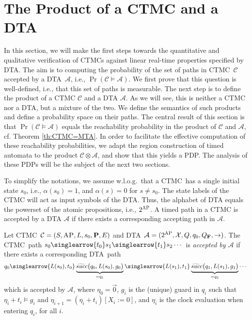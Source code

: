 \documentclass{LMCS}
\newcommand{\mc}[1]{\mathcal{#1}}
\newcommand{\<}{\langle}
\renewcommand{\>}{\rangle}
\newcommand{\mC}{\mathcal{C}}
\newcommand{\mA}{\mathcal{A}}
\newcommand{\CTMC}{\textsc{{CTMC}}}
\newcommand{\DTA}{\textsc{DTA}}
\newcommand{\mv}[1]{\singlearrow{#1}}
\renewcommand{\P}{{\bf P}}
\newcommand{\AP}{\textsc{AP}}
\begin{document}
\section{The Product of a CTMC and a DTA}\label{sec:DTA}

In this section, we will make the first steps towards the quantitative and qualitative
verification of CTMCs against linear real-time properties specified by \DTA.
The aim is to computing the probability of the set of paths in \CTMC\ $\mC$
accepted by a \DTA\ $\mA$, i.e., $\Pr(\mc{C} \models \mc{A})$.
We first prove that this question is well-defined, i.e., that this set of paths is
measurable.
The next step is to define the product of a CTMC $\mc{C}$ and a DTA $\mc{A}$.
As we will see, this is neither a CTMC nor a DTA, but a mixture of the two.
We define the semantics of such products and define a probability space on their
paths.
The central result of this section is that $\Pr(\mc{C} \models \mc{A})$ equals
the reachability probability in the product of $\mC$ and $\mA$, cf. Theorem
\ref{th:CTMC=MTA}.
In order to facilitate the effective computation of these reachability probabilities,
we adapt the region construction of timed automata to the product $\mc{C}
\otimes \mc{A}$, and show that this yields a PDP.
The analysis of these PDPs will be the subject of the next two sections.


To simplify the notations, we assume w.l.o.g.\ that a \CTMC\ has a single initial
state $s_0$, i.e., $\alpha(s_0) = 1$, and $\alpha(s) = 0$ for $s \neq s_0$.
The state labels of the CTMC will act as input symbols of the DTA.
Thus, the alphabet of DTA equals the powerset of the atomic propositions, i.e.,
$2^\AP$.
A timed path in a CTMC is accepted by a DTA $\mA$ if there exists a corresponding
accepting path in $\mA$.

\begin{defi}
Let \CTMC\ $\mC = (S, \AP, L, s_0, \P, E)$ and \DTA\ $\mA = (2^\AP, \mc{X}, Q,
q_0, Q_\mathbf{F},\rightarrow)$.
The \CTMC\ path $s_0\mv{t_0}s_1\mv{t_1}s_2\cdots $ is \emph{accepted
by $\mA$} if there exists a corresponding \DTA\ path
\[
q_0
\mv{L(s_0),t_0}
\underbrace{\widetilde{succ}\big(q_0,L(s_0),g_0\big)}_{= q_1}
\mv{L(s_1),t_1}
\underbrace{\widetilde{succ}\big(q_1,L(s_1),g_1\big)}_{= q_2}\cdots
\]
which is accepted by $\mA$, where $\eta_0 = \vec{0}$, $g_i$ is the (unique) guard
in $q_i$ such that $\eta_i{+}t_i \models g_i$ and $\eta_{i+1}=(\eta_i{+}t_i)[X_i:=0]$,
and $\eta_i$ is the clock evaluation when entering $q_i$, for all $i$.
\end{defi}
\end{document}
